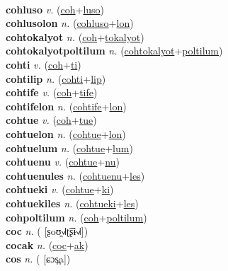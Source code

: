  \label{cohak} \\
\textbf{cohluso} \textit{v.} (\hyperref[coh]{coh}+\hyperref[luso]{luso})
 \label{cohluso} \\
\textbf{cohlusolon} \textit{n.} (\hyperref[cohluso]{cohluso}+\hyperref[lon]{lon})
 \label{cohlusolon} \\
\textbf{cohtokalyot} \textit{n.} (\hyperref[coh]{coh}+\hyperref[tokalyot]{tokalyot})
 \label{cohtokalyot} \\
\textbf{cohtokalyotpoltilum} \textit{n.} (\hyperref[cohtokalyot]{cohtokalyot}+\hyperref[poltilum]{poltilum})
 \label{cohtokalyotpoltilum} \\
\textbf{cohti} \textit{v.} (\hyperref[coh]{coh}+\hyperref[ti]{ti})
 \label{cohti} \\
\textbf{cohtilip} \textit{n.} (\hyperref[cohti]{cohti}+\hyperref[lip]{lip})
 \label{cohtilip} \\
\textbf{cohtife} \textit{v.} (\hyperref[coh]{coh}+\hyperref[tife]{tife})
 \label{cohtife} \\
\textbf{cohtifelon} \textit{n.} (\hyperref[cohtife]{cohtife}+\hyperref[lon]{lon})
 \label{cohtifelon} \\
\textbf{cohtue} \textit{v.} (\hyperref[coh]{coh}+\hyperref[tue]{tue})
 \label{cohtue} \\
\textbf{cohtuelon} \textit{n.} (\hyperref[cohtue]{cohtue}+\hyperref[lon]{lon})
 \label{cohtuelon} \\
\textbf{cohtuelum} \textit{n.} (\hyperref[cohtue]{cohtue}+\hyperref[lum]{lum})
 \label{cohtuelum} \\
\textbf{cohtuenu} \textit{v.} (\hyperref[cohtue]{cohtue}+\hyperref[nu]{nu})
 \label{cohtuenu} \\
\textbf{cohtuenules} \textit{n.} (\hyperref[cohtuenu]{cohtuenu}+\hyperref[les]{les})
 \label{cohtuenules} \\
\textbf{cohtueki} \textit{v.} (\hyperref[cohtue]{cohtue}+\hyperref[ki]{ki})
 \label{cohtueki} \\
\textbf{cohtuekiles} \textit{n.} (\hyperref[cohtueki]{cohtueki}+\hyperref[les]{les})
 \label{cohtuekiles} \\
\textbf{cohpoltilum} \textit{n.} (\hyperref[coh]{coh}+\hyperref[poltilum]{poltilum})
 \label{cohpoltilum} \\
\textbf{coc} \textit{n.} ( [ʂoʊ̯˧˩˧ʈ͡ʂɨ˧˩˧])
 \label{coc} \\
\textbf{cocak} \textit{n.} (\hyperref[coc]{coc}+\hyperref[ak]{ak})
 \label{cocak} \\
\textbf{cos} \textit{n.} ( [ɕɔs̪a])
